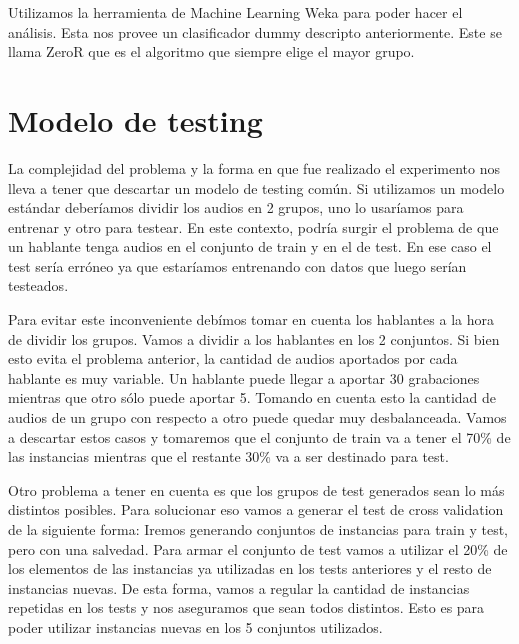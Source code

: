 Utilizamos la herramienta de Machine Learning Weka para poder hacer el análisis. Esta nos provee un clasificador dummy descripto anteriormente. Este se llama ZeroR que es el algoritmo que siempre elige el mayor grupo.

\section{Modelo de testing}

La complejidad del problema y la forma en que fue realizado el experimento nos lleva a tener que descartar un modelo de testing común. Si utilizamos un modelo estándar deberíamos dividir los audios en 2 grupos, uno lo usaríamos para entrenar y otro para testear. En este contexto, podría surgir el problema de que un hablante tenga audios en el conjunto de train y en el de test. En ese caso el test sería erróneo ya que estaríamos entrenando con datos que luego serían testeados.

Para evitar este inconveniente debímos tomar en cuenta los hablantes a la hora de dividir los grupos. Vamos a dividir a los hablantes en los 2 conjuntos. Si bien esto evita el problema anterior, la cantidad de audios aportados por cada hablante es muy variable. Un hablante puede llegar a aportar 30 grabaciones mientras que otro sólo puede aportar 5. Tomando en cuenta esto la cantidad de audios de un grupo con respecto a otro puede quedar muy desbalanceada. Vamos a descartar estos casos y tomaremos que el conjunto de train va a tener el 70\% de las instancias mientras que el restante 30\% va a ser destinado para test.

Otro problema a tener en cuenta es que los grupos de test generados sean lo más distintos posibles. Para solucionar eso vamos a generar el test de cross validation de la siguiente forma: Iremos generando conjuntos de instancias para train y test, pero con una salvedad. Para armar el conjunto de test vamos a utilizar el 20\% de los elementos de las instancias ya utilizadas en los tests anteriores y el resto de instancias nuevas. De esta forma, vamos a regular la cantidad de instancias repetidas en los tests y nos aseguramos que sean todos distintos. Esto es para poder utilizar instancias nuevas en los 5 conjuntos utilizados. 

